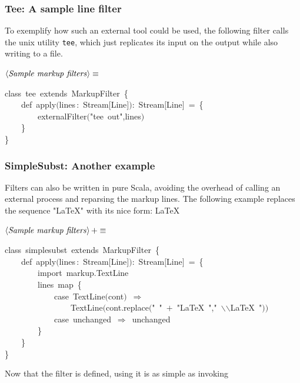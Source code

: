 \documentclass[a4paper,12pt]{article}
\begin{document}
\subsubsection{Tee: A sample line filter}
To exemplify how such an external tool could be used, the following filter calls
the unix utility \texttt{tee}, which just replicates its input on the output while
also writing to a file.

$\left<\mbox{\emph{Sample markup filters}}\right>\equiv$
\begin{program}{\vem class}~tee~{\vem extends}~MarkupFilter~{\small\{}
\\~~~~{\vem def}~apply$($lines\,{\rm :}~Stream$[$Line$]$$)${\rm :}~Stream$[$Line$]$~=~{\small\{}
\\~~~~~~~~externalFilter$($"tee~out",lines$)$
\\~~~~{\small\}}
\\{\small\}}
\\[0.5em]\end{program}
\subsubsection{SimpleSubst: Another example}
Filters can also be written in pure Scala, avoiding the overhead of calling an
external process and reparsing the markup lines. The following example replaces
the sequence "LaTeX" with its nice form: \LaTeX

$\left<\mbox{\emph{Sample markup filters}}\right>+\equiv$
\begin{program}{\vem class}~simplesubst~{\vem extends}~MarkupFilter~{\small\{}
\\~~~~{\vem def}~apply$($lines\,{\rm :}~Stream$[$Line$]$$)${\rm :}~Stream$[$Line$]$~=~{\small\{}
\\~~~~~~~~{\vem import}~markup.TextLine
\\~~~~~~~~lines~map~{\small\{}
\\~~~~~~~~~~~~{\vem case}~TextLine$($cont$)$~$\Rightarrow$
\\~~~~~~~~~~~~~~~~TextLine$($cont.replace$($"~"~$+$~"LaTeX~","~$\backslash$$\backslash$LaTeX~"$)$$)$
\\~~~~~~~~~~~~{\vem case}~unchanged~$\Rightarrow$~unchanged
\\~~~~~~~~{\small\}}
\\~~~~{\small\}}
\\{\small\}}
\\[0.5em]\end{program}
Now that the filter is defined, using it is as simple as invoking
\end{document}
